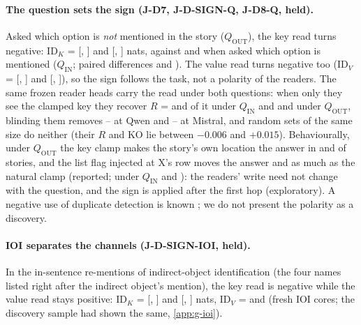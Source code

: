 \paragraph{The question sets the sign (J-D7, J-D-SIGN-Q, J-D8-Q, held).} Asked which option is \emph{not} mentioned in the story ($Q_{\mathrm{OUT}}$), the key read turns negative: $\mathrm{ID}_K$ = \JdSevenQoutQwenSeven{} [\JdSevenQoutQwenSevenLo{}, \JdSevenQoutQwenSevenHi{}] and \JdSevenQoutMistralSeven{} [\JdSevenQoutMistralSevenLo{}, \JdSevenQoutMistralSevenHi{}] nats, against \JdSevenQinQwenSeven{} and \JdSevenQinMistralSeven{} when asked which option is mentioned ($Q_{\mathrm{IN}}$; paired differences \JdSevenDiffQwenSeven{} and \JdSevenDiffMistralSeven{}). The value read turns negative too ($\mathrm{ID}_V$ = \JdSignQIDVQwenSeven{} [\JdSignQIDVQwenSevenLo{}, \JdSignQIDVQwenSevenHi{}] and \JdSignQIDVMistralSeven{} [\JdSignQIDVMistralSevenLo{}, \JdSignQIDVMistralSevenHi{}]), so the sign follows the task, not a polarity of the readers. The same frozen reader heads carry the read under both questions: when only they see the clamped key they recover $R$ = \JdEightQinRQwenSeven{} and \JdEightQinRMistralSeven{} of it under $Q_{\mathrm{IN}}$ and \JdEightQoutRQwenSeven{} and \JdEightQoutRMistralSeven{} under $Q_{\mathrm{OUT}}$, blinding them removes \JdEightQinKOQwenSeven{}--\JdEightQoutKOQwenSeven{} at Qwen and \JdEightQinKOMistralSeven{}--\JdEightQoutKOMistralSeven{} at Mistral, and random sets of the same size do neither (their $R$ and KO lie between $-0.006$ and $+0.015$). %
 Behaviourally, under $Q_{\mathrm{OUT}}$ the key clamp makes the story's own location the answer in \pct{\JdQoutKSQwenSeven} and \pct{\JdQoutKSMistralSeven} of stories, and the list flag injected at X's row moves the answer \JdNineQoutRatioQwenSeven{} and \JdNineQoutRatioMistralSeven{} as much as the natural clamp (reported; under $Q_{\mathrm{IN}}$ \JdNineQinRatioQwenSeven{} and \JdNineQinRatioMistralSeven{}): the readers' write need not change with the question, and the sign is applied after the first hop (exploratory). A negative use of duplicate detection is known \citep{wang2022ioi,mcdougall2023copy}; we do not present the polarity as a discovery.

\paragraph{IOI separates the channels (J-D-SIGN-IOI, held).} In the in-sentence re-mentions of indirect-object identification (the four names listed right after the indirect object's mention), the key read is negative while the value read stays positive: $\mathrm{ID}_K$ = \JdSignIoiIDKQwenSeven{} [\JdSignIoiIDKQwenSevenLo{}, \JdSignIoiIDKQwenSevenHi{}] and \JdSignIoiIDKMistralSeven{} [\JdSignIoiIDKMistralSevenLo{}, \JdSignIoiIDKMistralSevenHi{}] nats, $\mathrm{ID}_V$ = \JdSignIoiIDVQwenSeven{} and \JdSignIoiIDVMistralSeven{} (fresh IOI cores; the discovery sample had shown the same, \cref{app:g-ioi}).

